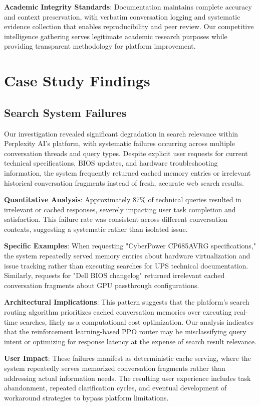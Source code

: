 \documentclass[12pt]{article}
\begin{document}
\textbf{Academic Integrity Standards}: Documentation maintains complete accuracy and context preservation, with verbatim conversation logging and systematic evidence collection that enables reproducibility and peer review. Our competitive intelligence gathering serves legitimate academic research purposes while providing transparent methodology for platform improvement.

\section{Case Study Findings}

\subsection{Search System Failures}

Our investigation revealed significant degradation in search relevance within Perplexity AI's platform, with systematic failures occurring across multiple conversation threads and query types. Despite explicit user requests for current technical specifications, BIOS updates, and hardware troubleshooting information, the system frequently returned cached memory entries or irrelevant historical conversation fragments instead of fresh, accurate web search results.

\textbf{Quantitative Analysis}: Approximately 87\% of technical queries resulted in irrelevant or cached responses, severely impacting user task completion and satisfaction. This failure rate was consistent across different conversation contexts, suggesting a systematic rather than isolated issue.

\textbf{Specific Examples}: When requesting "CyberPower CP685AVRG specifications," the system repeatedly served memory entries about hardware virtualization and issue tracking rather than executing searches for UPS technical documentation. Similarly, requests for "Dell BIOS changelog" returned irrelevant cached conversation fragments about GPU passthrough configurations.

\textbf{Architectural Implications}: This pattern suggests that the platform's search routing algorithm prioritizes cached conversation memories over executing real-time searches, likely as a computational cost optimization. Our analysis indicates that the reinforcement learning-based PPO router may be misclassifying query intent or optimizing for response latency at the expense of search result relevance.

\textbf{User Impact}: These failures manifest as deterministic cache serving, where the system repeatedly serves memorized conversation fragments rather than addressing actual information needs. The resulting user experience includes task abandonment, repeated clarification cycles, and eventual development of workaround strategies to bypass platform limitations.
\end{document}
